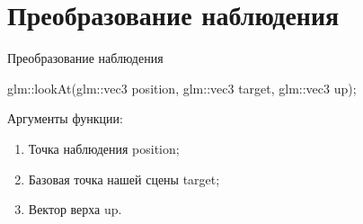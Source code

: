 \documentclass{beamer}
\begin{document}
	\section{Преобразование наблюдения}
	\begin{frame}{Преобразование наблюдения}
		
		glm::lookAt(glm::vec3 position, glm::vec3 target, glm::vec3 up);

		Аргументы функции:
		\begin{enumerate}
			\item Точка наблюдения position;
			\item Базовая точка нашей сцены target;
			\item Вектор верха up.
		\end{enumerate}
		
	\end{frame}

	
\end{document}
